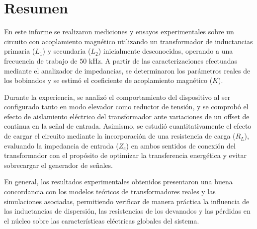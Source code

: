 \section{Resumen}
En este informe se realizaron mediciones y ensayos experimentales sobre un circuito con acoplamiento magnético utilizando un transformador de inductancias primaria ($L_1$) y secundaria ($L_2$) inicialmente desconocidas, operando a una frecuencia de trabajo de $50\text{ kHz}$. A partir de las caracterizaciones efectuadas mediante el analizador de impedancias, se determinaron los parámetros reales de los bobinados y se estimó el coeficiente de acoplamiento magnético ($K$). 

Durante la experiencia, se analizó el comportamiento del dispositivo al ser configurado tanto en modo elevador como reductor de tensión, y se comprobó el efecto de aislamiento eléctrico del transformador ante variaciones de un offset de continua en la señal de entrada. Asimismo, se estudió cuantitativamente el efecto de cargar el circuito mediante la incorporación de una resistencia de carga ($R_L$), evaluando la impedancia de entrada ($Z_e$) en ambos sentidos de conexión del transformador con el propósito de optimizar la transferencia energética y evitar sobrecargar el generador de señales.

En general, los resultados experimentales obtenidos presentaron una buena concordancia con los modelos teóricos de transformadores reales y las simulaciones asociadas, permitiendo verificar de manera práctica la influencia de las inductancias de dispersión, las resistencias de los devanados y las pérdidas en el núcleo sobre las características eléctricas globales del sistema.

\newpage
